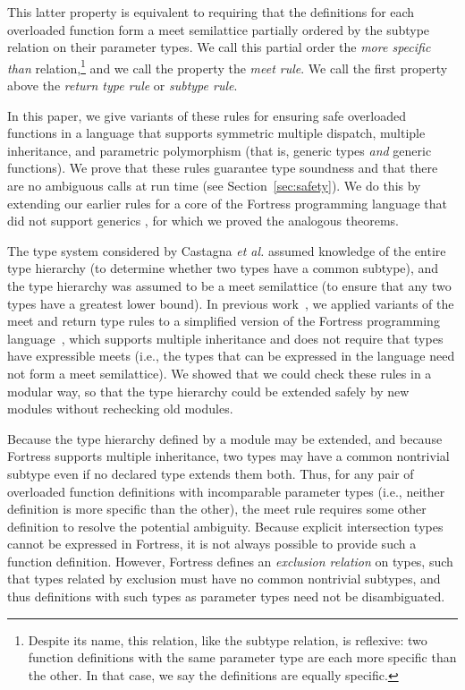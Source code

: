 This latter property is equivalent to requiring
that the definitions for each overloaded function form a meet semilattice 
partially ordered by the subtype relation on their parameter types.
We call this partial order the \emph{more specific than} relation,\!\footnote{%
Despite its name,
this relation, like the subtype relation, is reflexive: 
two function definitions with the same parameter type 
are each more specific than the other.
In that case, we say the definitions are equally specific.}
and we call the property the \emph{meet rule}.
We call the first property above the \emph{return type rule} or \emph{subtype rule}.

In this paper, 
we give variants of these rules for ensuring safe overloaded functions 
in a language that supports symmetric multiple dispatch, 
multiple inheritance, and parametric polymorphism 
(that is, generic types \emph{and} generic functions).
We prove that these rules guarantee type soundness
and that there are no ambiguous calls at run time 
(see Section~\ref{sec:safety}).
We do this by extending our earlier rules 
for a core of the Fortress programming language 
that did not support generics \cite{allen07,Fortress},
for which we proved the analogous theorems.



The type system considered by Castagna \emph{et al.} 
assumed knowledge of the entire type hierarchy 
(to determine whether two types have a common subtype), 
and the type hierarchy was assumed to be a meet semilattice 
(to ensure that any two types have a greatest lower bound).
In previous work~\cite{allen07},
we applied variants of the meet and return type rules
to a simplified version of the Fortress programming language~\cite{Fortress}, 
which supports multiple inheritance 
and does not require that types have expressible meets 
(i.e., the types that can be expressed in the language 
need not form a meet semilattice).
We showed that we could check these rules in a modular way, 
so that the type hierarchy could be extended safely by new modules
without rechecking old modules.

Because the type hierarchy defined by a module may be extended,
and because Fortress supports multiple inheritance,
two types may have a common nontrivial subtype 
even if no declared type extends them both.
Thus,
for any pair of overloaded function definitions with incomparable parameter types
(i.e., neither definition is more specific than the other),
the meet rule requires some other definition to resolve the potential ambiguity.
Because explicit intersection types cannot be expressed in Fortress, 
it is not always possible to provide such a function definition.
However, 
Fortress defines an \emph{exclusion relation} on types, 
such that types related by exclusion must have no common nontrivial subtypes,
and thus definitions with such types as parameter types 
need not be disambiguated.

